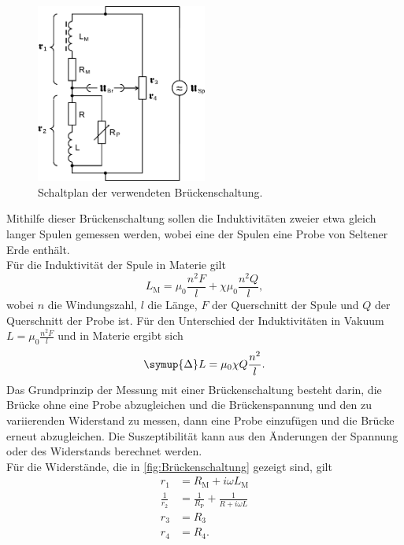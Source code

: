     \begin{figure}
      \centering
      \includegraphics[width=0.5\textwidth]{content/img/Abb_2.pdf}
      \caption{Schaltplan der verwendeten Brückenschaltung. \cite{versuchsanleitung}}
      \label{fig:Brückenschaltung}
    \end{figure}
    Mithilfe dieser Brückenschaltung sollen die Induktivitäten zweier etwa gleich langer Spulen gemessen werden,
    wobei eine der Spulen eine Probe von Seltener Erde enthält.\\
    Für die Induktivität der Spule in Materie gilt
    \begin{equation*}
        L_\text{M} = \mu_0 \frac{n^2 F}{l} + \chi \mu_0 \frac{n^2 Q}{l} ,
    \end{equation*}
    wobei $n$ die Windungszahl, $l$ die Länge, $F$ der Querschnitt der Spule und $Q$ der Querschnitt der Probe ist.
    Für den Unterschied der Induktivitäten in Vakuum $L = \mu_0 \frac{n^2 F}{l}$ und in Materie ergibt sich
    \begin{equation*}
        \symup{\Delta} L = \mu_0 \chi Q \frac{n^2}{l} .
    \end{equation*}
    Das Grundprinzip der Messung mit einer Brückenschaltung besteht darin,
    die Brücke ohne eine Probe abzugleichen und die Brückenspannung und den zu variierenden Widerstand zu messen,
    dann eine Probe einzufügen und die Brücke erneut abzugleichen.
    Die Suszeptibilität kann aus den Änderungen der Spannung oder des Widerstands berechnet werden.\\
    Für die Widerstände,
    die in \autoref{fig:Brückenschaltung} gezeigt sind, gilt
    \begin{align*}
        r_1 &= R_\text{M} + i \omega L_\text{M} \\
        \frac{1}{r_2} &= \frac{1}{R_\text{P}} + \frac{1}{R + i \omega L} \\
        r_3 &= R_3 \\
        r_4 &= R_4 .
    \end{align*}
